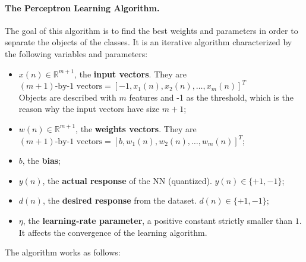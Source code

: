 \paragraph*{The Perceptron Learning Algorithm.} The goal of this algorithm is to find the best weights and parameters in order to separate the objects of the classes. It is an iterative algorithm characterized by the following variables and parameters:
\begin{itemize}

	\item $x(n) \in \mathbb{R}^{m+1}$, the \textbf{input vectors}. They are $(m+1)\text{-by-1 vectors} = [-1, x_1(n), x_2(n), \dots, x_m(n)]^T$\\
	Objects are described with $m$ features and -1 as the threshold, which is the reason why the input vectors have size $m+1$;
 
	\item $w(n) \in \mathbb{R}^{m+1}$, the \textbf{weights vectors}. They are $(m+1)\text{-by-1 vectors} = [b, w_1(n), w_2(n), \dots, w_m(n)]^T$;
 
	\item $b$, the \textbf{bias};
 
	\item $y(n)$, the \textbf{actual response} of the NN (quantized). $y(n) \in \{ +1, -1 \}$;
 
	\item $d(n)$, the \textbf{desired response} from the dataset. $d(n) \in \{ +1, -1 \}$;
 
	\item $\eta$, the \textbf{learning-rate parameter}, a positive constant strictly smaller than $1$. It affects the convergence of the learning algorithm. 
\end{itemize}

The algorithm works as follows:

